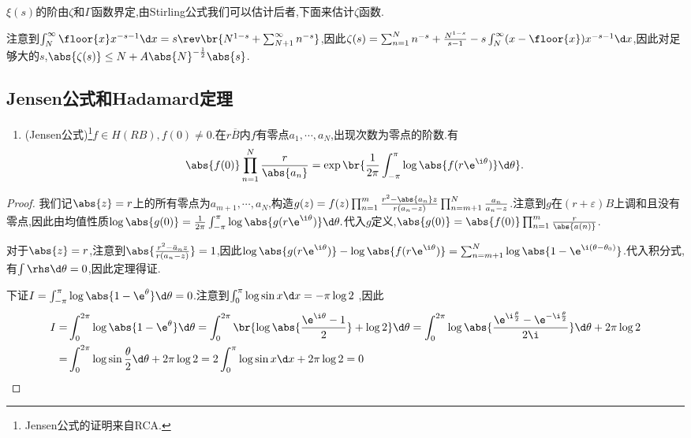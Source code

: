 \documentclass{article}
\begin{document}
$\xi(s)$的阶由$\zeta$和$\Gamma$函数界定,由Stirling公式我们可以估计后者,下面来估计$\zeta$函数.

注意到$\int_{N}^{\infty}\floor{x}x^{-s-1}\d x=s\rev\br{N^{1-s}+\sum_{N+1}^{\infty}n^{-s}}$,因此$\zeta(s)=\sum_{n=1}^{N}n^{-s}+\frac{N^{1-s}}{s-1}-s\int_{N}^{\infty}(x-\floor{x})x^{-s-1}\d x$,因此对足够大的$s$,$\abs{\zeta(s)}\leq N+A\abs{N}^{-\frac{1}{2}}\abs{s}$.

\subsection{Jensen公式和Hadamard定理}
\begin{enumerate}
    \item (Jensen公式)\footnote{Jensen公式的证明来自RCA.}$f\in H(RB),f(0)\neq 0$.在$r\overline{B}$内$f$有零点$a_1,\cdots,a_N$,出现次数为零点的阶数.有
    $$\abs{f(0)}\prod_{n=1}^{N}\frac{r}{\abs{a_n}}=\exp\br{\frac{1}{2\pi}\int_{-\pi}^{\pi}\log\abs{f(r\e^{\i\theta})}\d\theta}.$$
\end{enumerate}
\begin{proof}
    我们记$\abs{z}=r$上的所有零点为$a_{m+1},\cdots,a_N$,构造$g(z)=f(z)\prod_{n=1}^m\frac{r^2-\abs{a_n}z}{r(a_n-z)}\prod_{n=m+1}^N\frac{a_n}{a_n-z}$.注意到$g$在$(r+\varepsilon)B$上调和且没有零点,因此由均值性质$\log\abs{g(0)}=\frac{1}{2\pi}\int_{-\pi}^{\pi}\log\abs{g(r\e^{\i\theta})}\d\theta.$代入$g$定义,$\abs{g(0)}=\abs{f(0)}\prod_{n=1}^m\frac{r}{\abs{a(n)}}$.

    对于$\abs{z}=r$,注意到$\abs{\frac{r^2-\bar{a}_nz}{r(a_n-z)}}=1$,因此$\log\abs{g(r\e^{\i\theta})}-\log\abs{f(r\e^{\i\theta})}=\sum_{n=m+1}^N\log\abs{1-\e^{\i(\theta-\theta_0)}}$.代入积分式,有$\int\rhs\d\theta=0$,因此定理得证.
    
    下证$I=\int_{-\pi}^{\pi}\log\abs{1-\e^{\theta}}\d\theta=0$.注意到$\int_0^{\pi}\log\sin x\d x=-\pi\log 2$ \footnotemark,因此$$\begin{aligned}
        I=&\int_{0}^{2\pi}\log\abs{1-\e^{\theta}}\d\theta=\int_{0}^{2\pi}\br{\log\abs{\frac{\e^{\i\theta}-1}{2}}+\log 2}\d\theta=\int_{0}^{2\pi}\log\abs{\frac{\e^{\i\frac{\theta}{2}}-\e^{-\i\frac{\theta}{2}}}{2\i}}\d\theta+2\pi\log 2\\
        =&\int_{0}^{2\pi}\log\sin\frac{\theta}{2}\d\theta+2\pi\log 2=2\int_0^{\pi}\log\sin x\d x+2\pi\log 2=0
    \end{aligned}$$
\end{proof}
\end{document}
